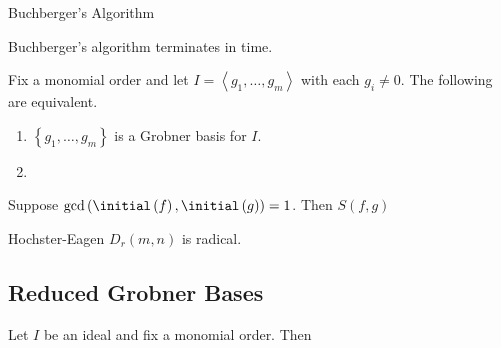 \documentclass[11pt]{article}
\begin{document}
    \begin{algorithm}{Buchberger's Algorithm}
        \FOR{}
        \DO{}
        \FOR{}
        \DO{}
        \IF{}
        \DO{}
        \DO{}
        \DONE
        \DONE
        \DONE
        \DO{}
    \end{algorithm}
    
    \begin{prop}{}
        Buchberger's algorithm terminates in \phantom{finite} time.
    \end{prop}

    \rruleline

    \begin{theorem}{}
        Fix a monomial order and let $I = \left< g_1,\ldots,g_m \right>$ with each $g_i\neq 0$. The following are equivalent.
        \begin{enumerate}
            \item $\left\lbrace g_1,\ldots,g_m \right\rbrace$ is a Grobner basis for $I$.
            \item
        \end{enumerate}
    \end{theorem}

    \rruleline

    \begin{lemma}{}
        Suppose $\gcd\left( \initial\left( f \right),\initial\left( g \right) \right)=1$. Then $S\left( f,g \right)$ 
    \end{lemma}

    \rruleline
    
    \begin{theorem}{Hochster-Eagen}
        $D_r\left( m,n \right)$ is radical.
    \end{theorem}

    \rruleline

    \subsection{Reduced Grobner Bases}
    
    \begin{theorem}{}
        Let $I$ be an ideal and fix a monomial order. Then 
    \end{theorem}
    
    \rruleline
    
    
    
    
    
    
    
    
    
    
    
    
    
    
    
    
    
\end{document}
